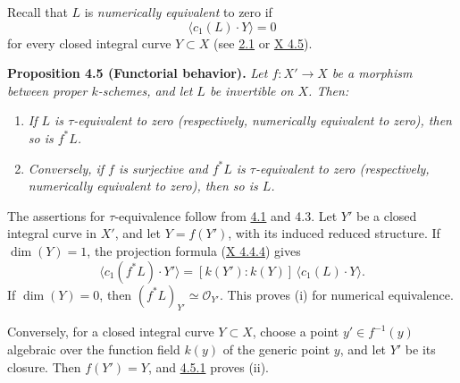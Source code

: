 Recall that \(L\) is \emph{numerically equivalent} to zero if
\[
\langle c_1(L)\cdot Y\rangle=0
\]
for every closed integral curve \(Y\subset X\) (see \hyperlink{sga6.e13.para.2-1}{2.1} or \hyperlink{sga6.e10.sec.4.5}{X 4.5}).

\textbf{Proposition 4.5 (Functorial behavior).} \emph{Let
\(f:X'\to X\) be a morphism between proper \(k\)-schemes, and let \(L\)
be invertible on \(X\). Then:}
\begin{enumerate}[label=(\roman*)]
\item \emph{If \(L\) is \(\tau\)-equivalent to zero (respectively,
numerically equivalent to zero), then so is \(f^*L\).}
\item \emph{Conversely, if \(f\) is surjective and \(f^*L\) is
\(\tau\)-equivalent to zero (respectively, numerically equivalent to
zero), then so is \(L\).}
\end{enumerate}

The assertions for \(\tau\)-equivalence follow from \hyperlink{sga6.e13.para.4-1}{4.1} and 4.3. Let
\(Y'\) be a closed integral curve in \(X'\), and let \(Y=f(Y')\), with
its induced reduced structure. If \(\dim(Y)=1\), the projection formula
(\hyperlink{sga6.e10.eq.4-4-4}{X 4.4.4}) gives
\begin{equation}
\langle c_1(f^*L)\cdot Y'\rangle
=[k(Y'):k(Y)]\,\langle c_1(L)\cdot Y\rangle.
\tag{4.5.1}
\end{equation}
If \(\dim(Y)=0\), then \((f^*L)_{Y'}\simeq\mathcal O_{Y'}\). This proves
(i) for numerical equivalence.

Conversely, for a closed integral curve \(Y\subset X\), choose a point
\(y'\in f^{-1}(y)\) algebraic over the function field \(k(y)\) of the
generic point \(y\), and let \(Y'\) be its closure. Then \(f(Y')=Y\), and
\hyperlink{sga6.e13.eq.4-5-1}{4.5.1} proves (ii).


